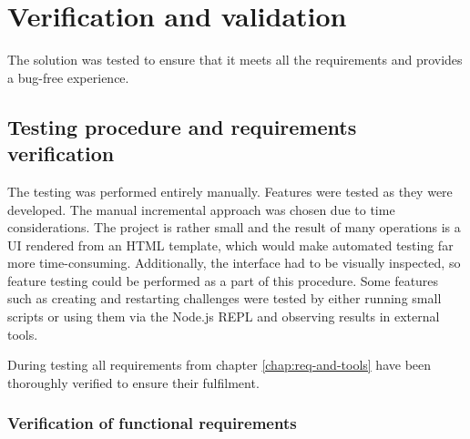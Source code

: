 \chapter{Verification and validation}

The solution was tested to ensure that it meets all the requirements and provides a bug-free experience.

\section{Testing procedure and requirements verification}

The testing was performed entirely manually. Features were tested as they were developed. The manual incremental approach was chosen due to time considerations. The project is rather small and the result of many operations is a UI rendered from an HTML template, which would make automated testing far more time-consuming. Additionally, the interface had to be visually inspected, so feature testing could be performed as a part of this procedure. Some features such as creating and restarting challenges were tested by either running small scripts or using them via the Node.js REPL and observing results in external tools.

During testing all requirements from chapter \ref{chap:req-and-tools} have been thoroughly verified to ensure their fulfilment.

\subsection{Verification of functional requirements}

